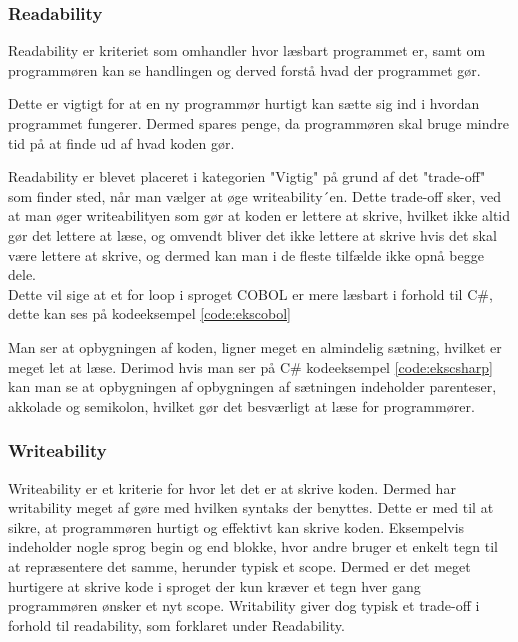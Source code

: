 \subsubsection{Readability} Readability er kriteriet som omhandler hvor læsbart programmet er, samt om programmøren kan se handlingen og derved forstå hvad der programmet gør.

Dette er vigtigt for at en ny programmør hurtigt kan sætte sig ind i hvordan programmet fungerer. Dermed spares penge, da programmøren skal bruge mindre tid på at finde ud af hvad koden gør. 

\noindent Readability er blevet placeret i kategorien "Vigtig" på grund af det "trade-off" som finder sted, når man vælger at øge writeability´en.
Dette trade-off sker, ved at man øger writeabilityen som gør at koden er lettere at skrive, hvilket ikke altid gør det lettere at læse, og omvendt bliver det ikke lettere at skrive hvis det skal være lettere at skrive, og dermed kan man i de fleste tilfælde ikke opnå begge dele.
\\
Dette vil sige at et for loop i sproget COBOL er mere læsbart i forhold til C\#, dette kan ses på kodeeksempel \ref{code:ekscobol}


\noindent Man ser at opbygningen af koden, ligner meget en almindelig sætning, hvilket er meget let at læse. Derimod hvis man ser på C\# kodeeksempel \ref{code:ekscsharp} kan man se at opbygningen af opbygningen af sætningen indeholder parenteser, akkolade og semikolon, hvilket gør det besværligt at læse for programmører.



\subsubsection{Writeability} Writeability er et kriterie for hvor let det er at skrive koden. 
Dermed har writability meget af gøre med hvilken syntaks der benyttes. 
Dette er med til at sikre, at programmøren hurtigt og effektivt kan skrive koden.
Eksempelvis indeholder nogle sprog begin og end blokke, hvor andre bruger et enkelt tegn til at repræsentere det samme, herunder typisk et scope. Dermed er det meget hurtigere at skrive kode i sproget der kun kræver et tegn hver gang programmøren ønsker et nyt scope.
Writability giver dog typisk et trade-off i forhold til readability, som forklaret under Readability.\\

